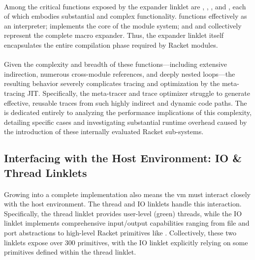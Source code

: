 			\paragraph{}%
				Among the critical functions exposed by the expander linklet are , , , and , each of which embodies substantial and complex functionality.  functions effectively as an interpreter;  implements the core of the module system; and  and  collectively represent the complete macro expander. Thus, the expander linklet itself encapsulates the entire compilation phase required by Racket modules.

			\paragraph{}%
				Given the complexity and breadth of these functions—including extensive indirection, numerous cross-module references, and deeply nested loops—the resulting behavior severely complicates tracing and optimization by the meta-tracing JIT. Specifically, the meta-tracer and trace optimizer struggle to generate effective, reusable traces from such highly indirect and dynamic code paths. The  is dedicated entirely to analyzing the performance implications of this complexity, detailing specific cases and investigating substantial runtime overhead caused by the introduction of these internally evaluated Racket sub-systems.

		\subsection{Interfacing with the Host Environment: IO \& Thread Linklets}

			\paragraph{}%
				Growing into a complete implementation also means the \gls{vm} must interact closely with the host environment. The thread and IO linklets handle this interaction. Specifically, the thread linklet provides user-level (green) threads, while the IO linklet implements comprehensive input/output capabilities ranging from file and port abstractions to high-level Racket primitives like . Collectively, these two linklets expose over 300 primitives, with the IO linklet explicitly relying on some primitives defined within the thread linklet.

